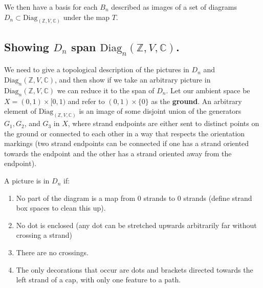 \documentclass[11pt]{article} %
\begin{document}
 We then have a basis for each $B_n$ described as images of a set of diagrams $D_n \subset \text{Diag}_{(\mathbb{Z},V,\mathbb{C})}$ under the map $T$.

\subsection{Showing $D_n$ span $\text{Diag}_n(\mathbb{Z},V,\mathbb{C})$.}

We need to give a topological description of the pictures in $D_n$ and $\text{Diag}_n(\mathbb{Z},V,\mathbb{C})$, and then show if we take an arbitrary picture in $\text{Diag}_n(\mathbb{Z},V,\mathbb{C})$ we can reduce it to the span of $D_n$. Let our ambient space be $X=(0,1) \times [0,1)$ and refer to $(0,1) \times \{0\}$ as the \textbf{ground}. An arbitrary element of $\text{Diag}_{(\mathbb{Z},V,\mathbb{C})}$ is an image of some disjoint union of the generators $G_1,G_2$, and $G_3$ in $X$, where strand endpoints are either sent to distinct points on the ground or connected to each other in a way that respects the orientation markings (two strand endpoints can be connected if one has a strand oriented towards the endpoint and the other has a strand oriented away from the endpoint). 


A picture is in $D_n$ if:

\begin{enumerate}
\item No part of the diagram is a map from 0 strands to 0 strands (define strand box spaces to clean this up).
\item No dot is enclosed (any dot can be stretched upwards arbitrarily far without crossing a strand)
\item There are no crossings.
\item The only decorations that occur are dots and brackets directed towards the left strand of a cap, with only one feature to a path.
\end{enumerate}
\end{document}
